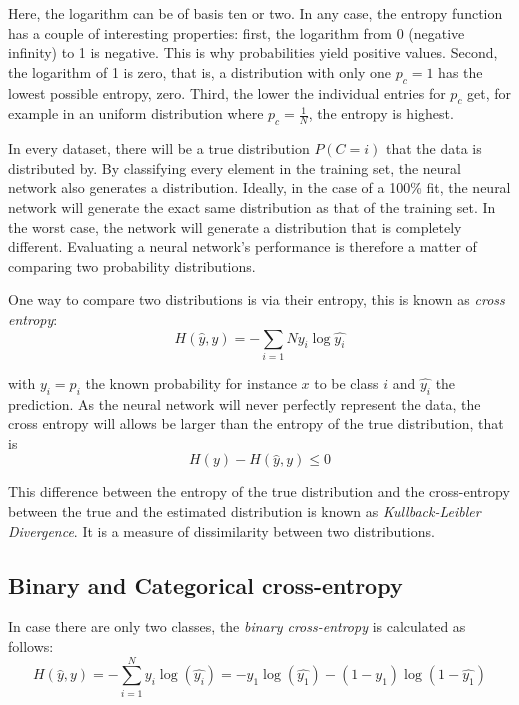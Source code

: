 Here, the logarithm can be of basis ten or two. In any case, the entropy function has a couple of interesting properties: first, the logarithm from 0 (negative infinity) to 1 is negative. This is why probabilities yield positive values. Second, the logarithm of 1 is zero, that is, a distribution with only one $p_c=1$ has the lowest possible entropy, zero. Third, the lower the individual entries for $p_c$ get, for example in an uniform distribution where $p_c=\frac{1}{N}$, the entropy is highest.

In every dataset, there will be a true distribution $P(C=i)$ that the data is distributed by. By classifying every element in the training set, the neural network also generates a distribution. Ideally, in the case of a 100\% fit, the neural network will generate the exact same distribution as that of the training set. In the worst case, the network will generate a distribution that is completely different. Evaluating a neural network's performance is therefore a matter of comparing two probability distributions.

One way to compare two distributions is via their entropy, this is known as \emph{cross entropy}:
\begin{equation}
H(\hat{y},y)=-\sum_{i=1}{N}y_i\log \hat{y_i}
\end{equation}

with $y_i=p_i$ the known probability for instance $x$ to be class $i$ and $\hat{y_i}$ the prediction. As the neural network will never perfectly represent the data, the cross entropy will allows be larger than the entropy of the true distribution, that is
\begin{equation}
H(y)-H(\hat{y},y) \leq 0
\end{equation}

This difference between the entropy of the true distribution and the cross-entropy between the true and the estimated distribution is known as \emph{Kullback-Leibler Divergence}. It is a measure of dissimilarity between two distributions. 

\subsection{Binary and Categorical cross-entropy}
In case there are only two classes, the \emph{binary cross-entropy} is calculated as follows:
\begin{equation}
H(\hat{y},y)=-\sum_{i=1}^Ny_i\log(\hat{y_i})=-y_1\log(\hat{y_1})-(1-y_1)\log(1-\hat{y_1})
\end{equation}


